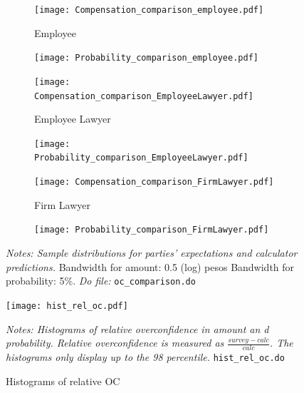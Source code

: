 \documentclass[11pt]{article}
\begin{document}
\begin{figure}[H]
    \caption{Actor's expectations and calculator predictions.}
    \label{figlabel}
    \begin{center}
    \begin{subfigure}{0.49\textwidth}
        \caption{Employee}
        \centering
        \texttt{[image: Compensation\_comparison\_employee.pdf]}
    \end{subfigure}
     \begin{subfigure}{0.49\textwidth}
        \centering
        \texttt{[image: Probability\_comparison\_employee.pdf]}
    \end{subfigure}
    \begin{subfigure}{0.49\textwidth}
        \caption{Employee Lawyer}
        \centering
        \texttt{[image: Compensation\_comparison\_EmployeeLawyer.pdf]}
        \end{subfigure}
          \begin{subfigure}{0.49\textwidth}
        \centering
        \texttt{[image: Probability\_comparison\_EmployeeLawyer.pdf]}
    \end{subfigure}
        \begin{subfigure}{0.49\textwidth}
            \caption{Firm Lawyer}
            \centering
            \texttt{[image: Compensation\_comparison\_FirmLawyer.pdf]}
    \end{subfigure}
    \begin{subfigure}{0.49\textwidth}
            \centering
            \texttt{[image: Probability\_comparison\_FirmLawyer.pdf]}
        \end{subfigure}
    \end{center}
     \footnotesize \textit{Notes: Sample distributions for parties' expectations and calculator predictions.} Bandwidth for amount: 0.5 (log) pesos  Bandwidth for probability: 5\%. 
      \footnotesize{ \textit{Do file: }  \texttt{oc\_comparison.do}}
\end{figure}





\begin{figure}[H]
    \caption{Histograms of relative OC}
    \label{hist_rel_oc}
    \begin{center}
        \texttt{[image: hist\_rel\_oc.pdf]}
        \end{center}
        {\footnotesize \textit{Notes: Histograms of relative overconfidence in amount an d probability. Relative overconfidence is measured as $\frac{survey-calc}{calc}$. The histograms only display up to the 98 percentile.}}
        \texttt{hist\_rel\_oc.do}
\end{figure}
\end{document}
